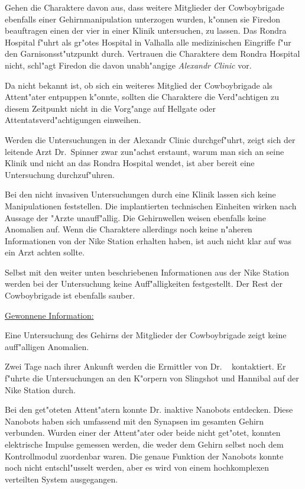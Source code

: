 
Gehen die Charaktere davon aus, dass weitere Mitglieder der Cowboybrigade ebenfalls einer Gehirnmanipulation unterzogen wurden, k"onnen sie Firedon beauftragen einen der vier in einer Klinik untersuchen, zu lassen. Das Rondra Hospital f"uhrt als gr"o\3tes Hospital in Valhalla alle medizinischen Eingriffe f"ur den Garnisonsst"utzpunkt durch. Vertrauen die Charaktere dem Rondra Hospital nicht, schl"agt Firedon die davon unabh"angige \emph{Alexandr Clinic} vor. 

Da nicht bekannt ist, ob sich ein weiteres Mitglied der Cowboybrigade als Attent"ater entpuppen k"onnte, sollten die Charaktere die Verd"achtigen zu diesem Zeitpunkt nicht in die Vorg"ange auf Hellgate oder Attentatsverd"achtigungen einweihen.

Werden die Untersuchungen in der Alexandr Clinic durchgef"uhrt, zeigt sich der leitende Arzt Dr.~Spinner zwar zun"achst erstaunt, warum man sich an seine Klinik und nicht an das Rondra Hospital wendet, ist aber bereit eine Untersuchung durchzuf"uhren. 

Bei den nicht invasiven Untersuchungen durch eine Klinik lassen sich keine Manipulationen feststellen. Die implantierten technischen Einheiten wirken nach Aussage der "Arzte unauff"allig. Die Gehirnwellen weisen ebenfalls keine Anomalien auf. Wenn die Charaktere allerdings noch keine n"aheren Informationen von der Nike Station erhalten haben, ist auch nicht klar auf was ein Arzt achten sollte. 

Selbst mit den weiter unten beschriebenen Informationen aus der Nike Station werden bei der Untersuchung keine Auff"alligkeiten festgestellt. Der Rest der Cowboybrigade ist ebenfalls sauber.

\begin{remarks}
	\underline{Gewonnene Information:}
	
	Eine Untersuchung des Gehirns der Mitglieder der Cowboybrigade zeigt keine auff"alligen Anomalien.
\end{remarks}


Zwei Tage nach ihrer Ankunft werden die Ermittler von Dr. ~  kontaktiert.  Er f"uhrte die Untersuchungen an den K"orpern von Slingshot und Hannibal auf der Nike Station durch.

Bei den get"oteten Attent"atern konnte Dr.   inaktive Nanobots entdecken. Diese Nanobots haben sich umfassend mit den Synapsen im gesamten Gehirn verbunden. Wurden einer der Attent"ater oder beide nicht get"otet, konnten elektrische Impulse gemessen werden, die weder dem Gehirn selbst noch dem Kontrollmodul zuordenbar waren. Die genaue Funktion der Nanobots konnte noch nicht entschl"usselt werden, aber es wird von einem hochkomplexen verteilten System ausgegangen.

